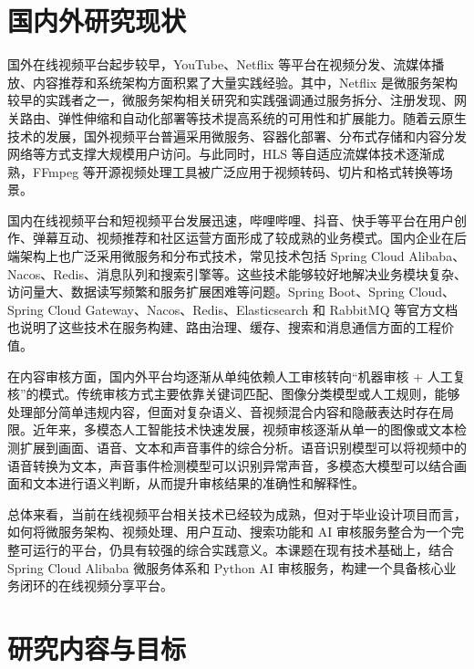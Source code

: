 \section{国内外研究现状}

国外在线视频平台起步较早，YouTube、Netflix 等平台在视频分发、流媒体播放、内容推荐和系统架构方面积累了大量实践经验。其中，Netflix 是微服务架构较早的实践者之一，微服务架构相关研究和实践强调通过服务拆分、注册发现、网关路由、弹性伸缩和自动化部署等技术提高系统的可用性和扩展能力\cite{lewis2014microservices,newman2021building,richardson2018microservices}。随着云原生技术的发展，国外视频平台普遍采用微服务、容器化部署、分布式存储和内容分发网络等方式支撑大规模用户访问。与此同时，HLS 等自适应流媒体技术逐渐成熟，FFmpeg 等开源视频处理工具被广泛应用于视频转码、切片和格式转换等场景\cite{ffmpegdocs,rfc8216hls}。

国内在线视频平台和短视频平台发展迅速，哔哩哔哩、抖音、快手等平台在用户创作、弹幕互动、视频推荐和社区运营方面形成了较成熟的业务模式。国内企业在后端架构上也广泛采用微服务和分布式技术，常见技术包括 Spring Cloud Alibaba、Nacos、Redis、消息队列和搜索引擎等。这些技术能够较好地解决业务模块复杂、访问量大、数据读写频繁和服务扩展困难等问题。Spring Boot、Spring Cloud、Spring Cloud Gateway、Nacos、Redis、Elasticsearch 和 RabbitMQ 等官方文档也说明了这些技术在服务构建、路由治理、缓存、搜索和消息通信方面的工程价值\cite{springbootdocs,springclouddocs,springgatewaydocs,nacosdocs,redisdocs,elasticsearchdocs,rabbitmqdocs}。

在内容审核方面，国内外平台均逐渐从单纯依赖人工审核转向“机器审核 + 人工复核”的模式。传统审核方式主要依靠关键词匹配、图像分类模型或人工规则，能够处理部分简单违规内容，但面对复杂语义、音视频混合内容和隐蔽表达时存在局限。近年来，多模态人工智能技术快速发展，视频审核逐渐从单一的图像或文本检测扩展到画面、语音、文本和声音事件的综合分析。语音识别模型可以将视频中的语音转换为文本，声音事件检测模型可以识别异常声音，多模态大模型可以结合画面和文本进行语义判断，从而提升审核结果的准确性和解释性\cite{radford2023whisper,gemmeke2017audioset,hershey2017cnn,tensorflow2024yamnet,bai2023qwen}。

总体来看，当前在线视频平台相关技术已经较为成熟，但对于毕业设计项目而言，如何将微服务架构、视频处理、用户互动、搜索功能和 AI 审核服务整合为一个完整可运行的平台，仍具有较强的综合实践意义。本课题在现有技术基础上，结合 Spring Cloud Alibaba 微服务体系和 Python AI 审核服务，构建一个具备核心业务闭环的在线视频分享平台。

\section{研究内容与目标}

